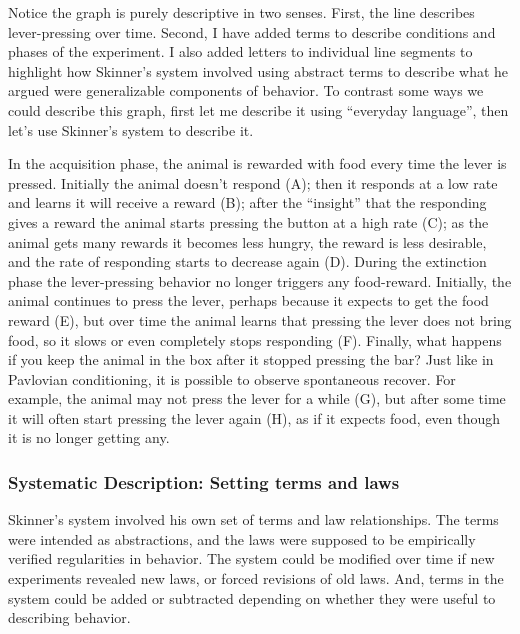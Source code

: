 \documentclass[
  oneside,
  12pt]{crumpbook}
\begin{document}
Notice the graph is purely descriptive in two senses. First, the line describes lever-pressing over time. Second, I have added terms to describe conditions and phases of the experiment. I also added letters to individual line segments to highlight how Skinner's system involved using abstract terms to describe what he argued were generalizable components of behavior. To contrast some ways we could describe this graph, first let me describe it using ``everyday language'', then let's use Skinner's system to describe it.

In the acquisition phase, the animal is rewarded with food every time the lever is pressed. Initially the animal doesn't respond (A); then it responds at a low rate and learns it will receive a reward (B); after the ``insight'' that the responding gives a reward the animal starts pressing the button at a high rate (C); as the animal gets many rewards it becomes less hungry, the reward is less desirable, and the rate of responding starts to decrease again (D). During the extinction phase the lever-pressing behavior no longer triggers any food-reward. Initially, the animal continues to press the lever, perhaps because it expects to get the food reward (E), but over time the animal learns that pressing the lever does not bring food, so it slows or even completely stops responding (F). Finally, what happens if you keep the animal in the box after it stopped pressing the bar? Just like in Pavlovian conditioning, it is possible to observe spontaneous recover. For example, the animal may not press the lever for a while (G), but after some time it will often start pressing the lever again (H), as if it expects food, even though it is no longer getting any.

\hypertarget{systematic-description-setting-terms-and-laws}{%
\subsubsection{Systematic Description: Setting terms and laws}\label{systematic-description-setting-terms-and-laws}}

Skinner's system involved his own set of terms and law relationships. The terms were intended as abstractions, and the laws were supposed to be empirically verified regularities in behavior. The system could be modified over time if new experiments revealed new laws, or forced revisions of old laws. And, terms in the system could be added or subtracted depending on whether they were useful to describing behavior.
\end{document}
